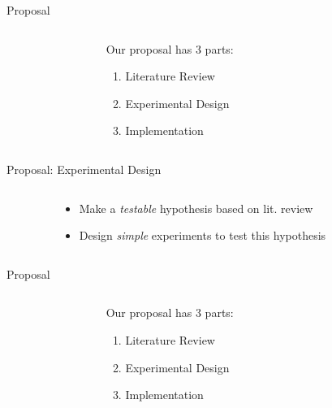 \documentclass[aspectratio=169]{beamer}
\newcommand{\bi}{\begin{itemize}}
\newcommand{\ei}{\end{itemize}}
\newcommand{\bn}{\begin{enumerate}}
\newcommand{\en}{\end{enumerate}}
\begin{document}
\begin{frame}{Proposal}
  \begin{columns}[T]
    \begin{column}{0.2\textwidth}
    \end{column}
    \begin{column}{0.6\textwidth}
      Our proposal has 3 parts:
      \bn
    \item Literature Review
    \item { Experimental Design}
    \item Implementation
      \en
    \end{column}
    \begin{column}{0.2\textwidth}
    \end{column}
  \end{columns}
\end{frame}

\begin{frame}{Proposal: Experimental Design}
  \begin{columns}[T]
    \begin{column}{0.2\textwidth}
    \end{column}
    \begin{column}{0.6\textwidth}
      \bi
      \pause
    \item Make a \emph{testable} hypothesis based on lit. review
      \pause
    \item Design \emph{simple} experiments to test this hypothesis
      \ei
    \end{column}
    \begin{column}{0.2\textwidth}
    \end{column}
  \end{columns}
\end{frame}

\begin{frame}{Proposal}
  \begin{columns}[T]
    \begin{column}{0.2\textwidth}
    \end{column}
    \begin{column}{0.6\textwidth}
      Our proposal has 3 parts:
      \bn
    \item Literature Review
    \item Experimental Design
    \item { Implementation}
      \en
    \end{column}
    \begin{column}{0.2\textwidth}
    \end{column}
  \end{columns}
\end{frame}
\end{document}
